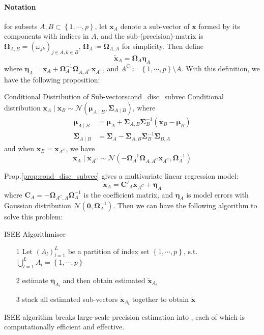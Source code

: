 \documentclass[twoside]{article}
\begin{document}
\paragraph*{Notation} for subsets $A,B\subset \left\{ 1,\cdots,p \right\}$, let $\mathbf{x}_A$ denote a sub-vector of $\mathbf{x}$ formed by its components with indices in $A$, and the sub-(precision)-matrix is $\boldsymbol{\Omega}_{A,B}=\left(\omega_{jk}\right)_{j\in A,k\in B}$, $\boldsymbol{\Omega}_A\coloneq \boldsymbol{\Omega}_{A,A}$ for simplicity.
Then define $$\tilde{\mathbf{x}}_A = \boldsymbol{\Omega}_A\boldsymbol{\eta}_A$$
where $\boldsymbol{\eta}_A = \mathbf{x}_A+ \boldsymbol{\Omega}_A^{-1}\boldsymbol{\Omega}_{A,A^C}\mathbf{x}_{A^C}$, and $A^C\coloneq \left\{1,\cdots,p\right\}\setminus A$. With this definition, we have the following proposition:

\begin{proposition}{Conditional Distribution of Sub-vectors}{cond_disc_subvec}
    Conditional distribution $\mathbf{x}_A\mid \mathbf{x}_B \sim \mathcal{N}\left(\boldsymbol{\mu}_{A\mid B},\boldsymbol{\Sigma}_{A\mid B}\right)$, where 
    \begin{align*}
        \boldsymbol{\mu}_{A\mid B} &= \boldsymbol{\mu}_A + \boldsymbol{\Sigma}_{A,B}\boldsymbol{\Sigma}_B^{-1}\left(\mathbf{x}_B-\boldsymbol{\mu}_{B}\right) \\
        \boldsymbol{\Sigma}_{A\mid B} &= \boldsymbol{\Sigma}_A-\boldsymbol{\Sigma}_{A,B}\boldsymbol{\Sigma}_B^{-1}\boldsymbol{\Sigma}_{B,A}
    \end{align*}
    and when $\mathbf{x}_B=\mathbf{x}_{A^C}$, we have
    $$
    \mathbf{x}_A\mid \mathbf{x}_{A^C} \sim \mathcal{N}\left( -\boldsymbol{\Omega}_A^{-1}\boldsymbol{\Omega}_{A,A^C}\mathbf{x}_{A^C},\boldsymbol{\Omega}_A^{-1} \right)
    $$
\end{proposition}
Prop.\ref{prop:cond_disc_subvec} gives a multivariate linear regression model:
$$
\mathbf{x}_A = \mathbf{C}'_A\mathbf{x}_{A^C}+\boldsymbol{\eta}_A
$$
where $\mathbf{C}_A=-\boldsymbol{\Omega}_{A^C,A}\boldsymbol{\Omega}^{-1}_A$ is the coefficient matrix, and $\boldsymbol{\eta}_A$ is model errors with Gaussian distribution $\mathcal{N}(\mathbf{0},\boldsymbol{\Omega}_A^{-1})$. Then we can have the following algorithm to solve this problem:

\begin{algorithm}{ISEE Algorithm}{isee}
    \begin{itemize}
        \item[1] Let $(A_l)^L_{l=1}$ be a partition of index set $\left\{ 1,\cdots,p \right\}$, s.t. $\bigcup ^L_{l=1}A_l=\left\{1,\cdots,p \right\}$
        \item[2] estimate $\boldsymbol{\eta}_{A_l}$ and then obtain estimated $\tilde{\mathbf{x}}_{A_l}$
        \item[3] stack all estimated sub-vectors $\tilde{\mathbf{x}}_{A_l}$ together to obtain $\tilde{\mathbf{x}}$
    \end{itemize}
\end{algorithm}
ISEE algorithm breaks large-scale precision estimation into \textbf{}, each of which is computationally efficient and effective.
\end{document}

